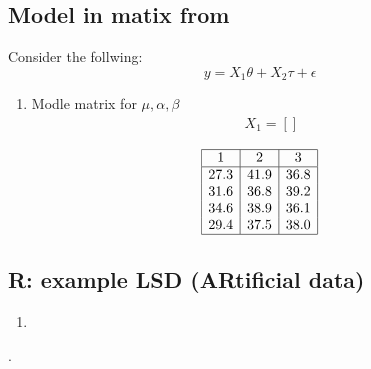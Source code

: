 \documentclass[10pt, oneside]{article}
\begin{document}
\subsection{Model in matix from}
Consider the follwing:
$$
	y = X_1\theta + X_2\tau + \epsilon
$$
\begin{enumerate}
	\item Modle matrix for $\mu, \alpha, \beta$
	      \[
		      \begin{split}
			      X_1 = []
		      \end{split}
	      \]
\end{enumerate}

$$
	\begin{array}{|c|c|c|}
		\hline
		1    & 2    & 3    \\
		\hline
		27.3 & 41.9 & 36.8 \\
		31.6 & 36.8 & 39.2 \\
		34.6 & 38.9 & 36.1 \\
		29.4 & 37.5 & 38.0 \\
		\hline
	\end{array}
$$

\subsection{R: example LSD (ARtificial data)}

\begin{enumerate}
	\item
\end{enumerate}.
\end{document}
